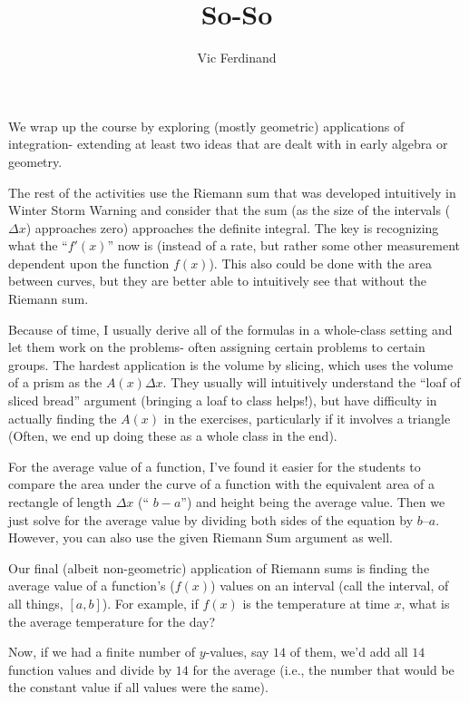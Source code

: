 \documentclass{ximera}
\author{Vic Ferdinand}
\title{So-So}
\begin{document}
\begin{abstract}
\end{abstract}
\maketitle

\begin{instructorIntro}
We wrap up the course by exploring (mostly geometric) applications of integration- extending at least two ideas that are dealt with in early algebra or geometry.  

The rest of the activities use the Riemann sum that was developed intuitively in Winter Storm Warning and consider that the sum (as the size of the intervals ($\Delta x$) approaches zero) approaches the definite integral.  The key is recognizing what the ``$f'(x)$'' now is (instead of a rate, but rather some other measurement dependent upon the function $f(x)$).  This also could be done with the area between curves, but they are better able to intuitively see that without the Riemann sum. 

Because of time, I usually derive all of the formulas in a whole-class setting and let them work on the problems- often assigning certain problems to certain groups. The hardest application is the volume by slicing, which uses the volume of a prism as the $A(x) \Delta x$.  They usually will intuitively understand the ``loaf of sliced bread'' argument (bringing a loaf to class helps!), but have difficulty in actually finding the $A(x)$ in the exercises, particularly if it involves a triangle (Often, we end up doing these as a whole class in the end).

For the average value of a function, I've found it easier for the students to compare the area under the curve of a function with the equivalent area of a rectangle of length $\Delta x$ (`` $b - a$'') and height being the average value.  Then we just solve for the average value by dividing both sides of the equation by $b – a$.  However, you can also use the given Riemann Sum argument as well.

\end{instructorIntro}

Our final (albeit non-geometric) application of Riemann sums is finding the average value of a function's ($f(x)$) values on an interval (call the interval, of all things, $[a, b]$).  For example, if $f(x)$ is the temperature at time $x$, what is the average temperature for the day?

Now, if we had a finite number of $y$-values, say $14$ of them, we'd add all $14$ function values and divide by $14$ for the average (i.e., the number that would be the constant value if all values were the same).  
\end{document}
